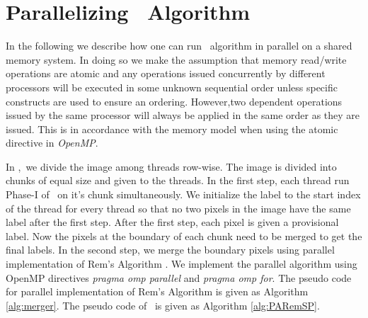 \section{Parallelizing \aremsp\ Algorithm}
\label{sec:parallel_algo}

In the following we describe how one can run \aremsp\ algorithm in parallel
on a shared memory system. In doing so we make the assumption that memory read/write 
operations are atomic and any operations issued concurrently by different processors will be executed in some unknown 
sequential order unless specific constructs are used to ensure an ordering.
However,two dependent operations issued by 
the same processor will always be applied in the same order as they are issued. 
This is in accordance with the memory model when using the atomic directive in
{\em OpenMP}.

In \paremsp,\ we divide the image among threads row-wise. The image is
divided into chunks of equal size and given to the threads. In the first step,
each thread run Phase-I of \aremsp\ on it's chunk simultaneously. We
initialize the label to the start index of the thread for every thread so that no 
two pixels in the image have the same label after the first step. After the first step, 
each pixel is given a provisional label. Now the pixels at the boundary of each chunk need to 
be merged to get the final labels. In the second step, we merge the boundary pixels using parallel 
implementation of Rem's Algorithm \cite{Patwary2012_PARemSP}. We implement the parallel algorithm using
OpenMP directives {\em pragma omp parallel} and {\em pragma omp for}. The
pseudo code for parallel implementation of Rem's Algorithm is given as Algorithm
\ref{alg:merger}. The pseudo code of \paremsp\ is given as Algorithm
\ref{alg:PARemSP}.

 
